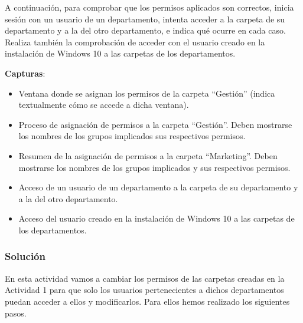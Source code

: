 A continuación, para comprobar que los permisos aplicados son correctos, inicia sesión con un usuario de un departamento, intenta acceder a la carpeta de su departamento y a la del otro departamento, e indica qué ocurre en cada caso. Realiza también la comprobación de acceder con el usuario creado en la instalación de Windows 10 a las carpetas de los departamentos.

\textbf{Capturas}:

\begin{itemize}
    \item Ventana donde se asignan los permisos de la carpeta ``Gestión'' (indica textualmente cómo se accede a dicha ventana).
    \item Proceso de asignación de permisos a la carpeta ``Gestión''. Deben mostrarse los nombres de los grupos implicados sus respectivos permisos.
    \item Resumen de la asignación de permisos a la carpeta ``Marketing''. Deben mostrarse los nombres de los grupos implicados y sus respectivos permisos.
    \item Acceso de un usuario de un departamento a la carpeta de su departamento y a la del otro departamento.
    \item Acceso del usuario creado en la instalación de Windows 10 a las carpetas de los departamentos.
\end{itemize}

\subsubsection{Solución}

En esta actividad vamos a cambiar los permisos de las carpetas creadas en la Actividad 1 para que solo los usuarios pertenecientes a dichos departamentos puedan acceder a ellos y modificarlos. Para ellos hemos realizado los siguientes pasos.

